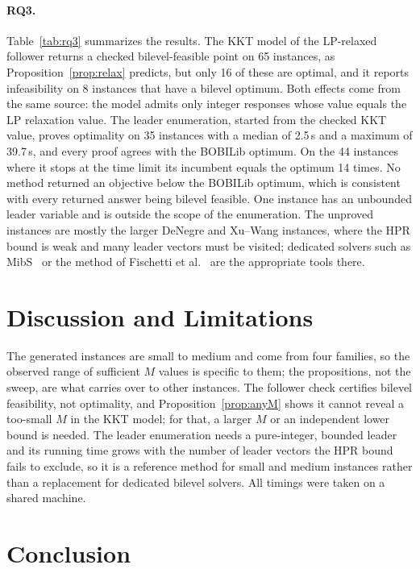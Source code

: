 \documentclass[11pt]{article}
\begin{document}
\paragraph{RQ3.} Table~\ref{tab:rq3} summarizes the results. The KKT model
of the LP-relaxed follower returns a checked bilevel-feasible point on 65
instances, as Proposition~\ref{prop:relax} predicts, but only 16 of these
are optimal, and it reports infeasibility on 8 instances that have a bilevel
optimum. Both effects come from the same source: the model admits only
integer responses whose value equals the LP relaxation value. The leader
enumeration, started from the checked KKT value, proves optimality on 35
instances with a median of 2.5\,s and a maximum of 39.7\,s, and every proof
agrees with the BOBILib optimum. On the 44 instances where it stops at the
time limit its incumbent equals the optimum 14 times. No method returned an
objective below the BOBILib optimum, which is consistent with every
returned answer being bilevel feasible. One instance has an unbounded leader variable and is
outside the scope of the enumeration. The unproved instances are mostly the
larger DeNegre and Xu--Wang instances, where the HPR bound is weak and many
leader vectors must be visited; dedicated solvers such as
MibS~\cite{tahernejad2020branch} or the method of Fischetti et
al.~\cite{fischetti2017new} are the appropriate tools there.

\section{Discussion and Limitations}
\label{sec:limits}

The generated instances are small to medium and come from four families, so
the observed range of sufficient $M$ values is specific to them; the
propositions, not the sweep, are what carries over to other instances. The
follower check certifies bilevel feasibility, not optimality, and
Proposition~\ref{prop:anyM} shows it cannot reveal a too-small $M$ in the
KKT model; for that, a larger $M$ or an independent lower bound is needed.
The leader enumeration needs a pure-integer, bounded leader and its running
time grows with the number of leader vectors the HPR bound fails to exclude,
so it is a reference method for small and medium instances rather than a
replacement for dedicated bilevel solvers. All timings were taken on a
shared machine.

\section{Conclusion}
\label{sec:conclusion}
\end{document}
